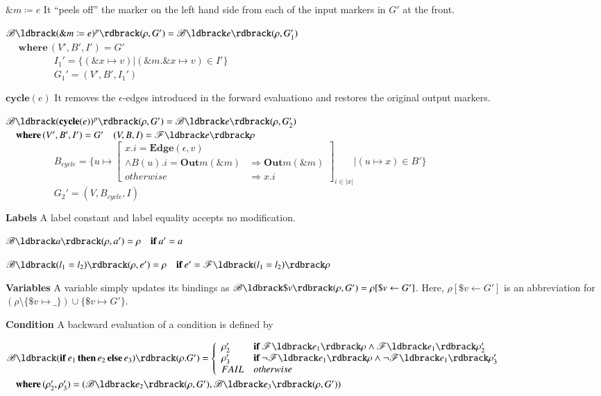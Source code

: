 \documentclass{llncs}
\begin{document}
$\&m\coloneqq e$ It ``peels off'' the marker on the left hand side from each of the input markers in $G'$ at the front.

$\mathscr{B}\ldbrack(\&m\coloneqq e)^p\rdbrack(\rho,G')=\mathscr{B}\ldbrack e\rdbrack(\rho,G_1')$\\
$\mbox{~~~~}\mathbf{where}\,(V',B',I')=G'$\\
$\mbox{~~~~~~~~~~~~~~~}I_1'=\{(\&x\mapsto v)|(\&m.\&x\mapsto v)\in I'\}$\\
$\mbox{~~~~~~~~~~~~~~~}G_1'=(V',B',I_1')$

 $\mathbf{cycle}(e)$ It removes the $\epsilon$-edges introduced in the forward evaluationo and restores the original output markers.

$\mathscr{B}\ldbrack(\mathbf{cycle}(e))^p\rdbrack(\rho,G')=\mathscr{B}\ldbrack e\rdbrack(\rho,G_2')$\\
$\mbox{~~~~}\mathbf{where}\,(V',B',I')=G'\quad(V,B,I)=\mathscr{F}\ldbrack e\rdbrack\rho$\\
$\mbox{~~~~~~~~~~~~~~~} B_{cycle}=\{ u\mapsto\left[
    \begin{array}{ll}
    x.i=\mathbf{Edge}(\epsilon,v)&\\
    \wedge B(u).i=\mathbf{Out}m(\&m)& \Rightarrow \mathbf{Out}m(\&m)\\
    otherwise & \Rightarrow x.i
    \end{array}\right]_{i\in|x|}|(u\mapsto x)\in B'\}$\\
$\mbox{~~~~~~~~~~~~~~~} G_2'=(V,B_{cycle},I)$

\textbf{Labels} A label constant and label equality accepts no modification.

$\mathscr{B}\ldbrack a\rdbrack(\rho,a')=\rho\quad\mathbf{if}\,a'=a$

$\mathscr{B}\ldbrack (l_1=l_2)\rdbrack(\rho,e')=\rho\quad\mathbf{if}\,e'=\mathscr{F}\ldbrack (l_1=l_2) \rdbrack\rho$

\textbf{Variables} A variable simply updates its bindings as $\mathscr{B}\ldbrack\$ v\rdbrack(\rho,G')=\rho[\$v\leftarrow G']$. Here, $\rho[\$v\leftarrow G']$ is an abbreviation for $(\rho\setminus\{\$v\mapsto\_\})\cup\{\$v\mapsto G'\}$.

\textbf{Condition} A backward evaluation of a condition is defined by

$\mathscr{B}\ldbrack (\mathbf{if}\,e_1\,\mathbf{then}\,e_2\,\mathbf{else}\,e_3)\rdbrack(\rho.G')=\left\{
    \begin{array}{ll}
     \rho_2'& \mathbf{if}\,\mathscr{F}\ldbrack e_1\rdbrack\rho\wedge\mathscr{F}\ldbrack e_1\rdbrack\rho_2'\\
     \rho_3'& \mathbf{if}\,\neg\mathscr{F}\ldbrack e_1\rdbrack\rho\wedge\neg\mathscr{F}\ldbrack e_1\rdbrack\rho_3'\\
     FAIL & otherwise
    \end{array}
    \right.$\\
$\mbox{~~~~}\mathbf{where}\,(\rho_2',\rho_3')=(\mathscr{B}\ldbrack e_2\rdbrack(\rho,G'),\mathscr{B}\ldbrack e_3\rdbrack(\rho,G'))$
\end{document}
